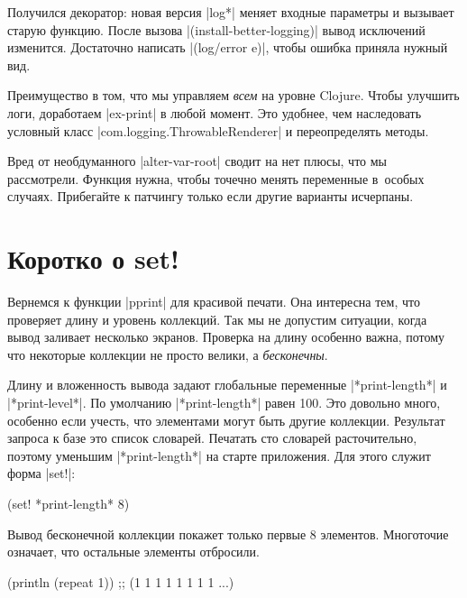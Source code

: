 Получился декоратор: новая версия \spverb|log*| меняет входные параметры и
вызывает старую функцию. После вызова \spverb|(install-better-logging)| вывод
исключений изменится. Достаточно написать \spverb|(log/error e)|, чтобы ошибка
приняла нужный вид.

Преимущество в том, что мы управляем \emph{всем} на уровне Clojure. Чтобы
улучшить логи, доработаем \spverb|ex-print| в любой момент. Это удобнее, чем
наследовать условный класс \spverb|com.logging.ThrowableRenderer| и
переопределять методы.

Вред от необдуманного \spverb|alter-var-root| сводит на нет плюсы, что мы
рассмотрели. Функция нужна, чтобы точечно менять переменные в~особых
случаях. Прибегайте к патчингу только если другие варианты исчерпаны.

\section{Коротко о set!}


Вернемся к функции \spverb|pprint| для красивой печати. Она интересна тем, что
проверяет длину и уровень коллекций. Так мы не допустим ситуации, когда вывод
заливает несколько экранов. Проверка на длину особенно важна, потому что
некоторые коллекции не просто велики, а \emph{бесконечны}.


Длину и вложенность вывода задают глобальные переменные \spverb|*print-length*|
и \spverb|*print-level*|. По умолчанию \spverb|*print-length*| равен 100. Это
довольно много, особенно если учесть, что элементами могут быть другие
коллекции. Результат запроса к базе это список словарей. Печатать сто
словарей расточительно, поэтому уменьшим \spverb|*print-length*| на старте
приложения. Для этого служит форма \spverb|set!|:

\begin{english}
  \begin{clojure}
(set! *print-length* 8)
  \end{clojure}
\end{english}

\noindent
Вывод бесконечной коллекции покажет только первые 8 элементов. Многоточие
означает, что остальные элементы отбросили.

\begin{english}
  \begin{clojure}
(println (repeat 1))
;; (1 1 1 1 1 1 1 1 ...)
  \end{clojure}
\end{english}

